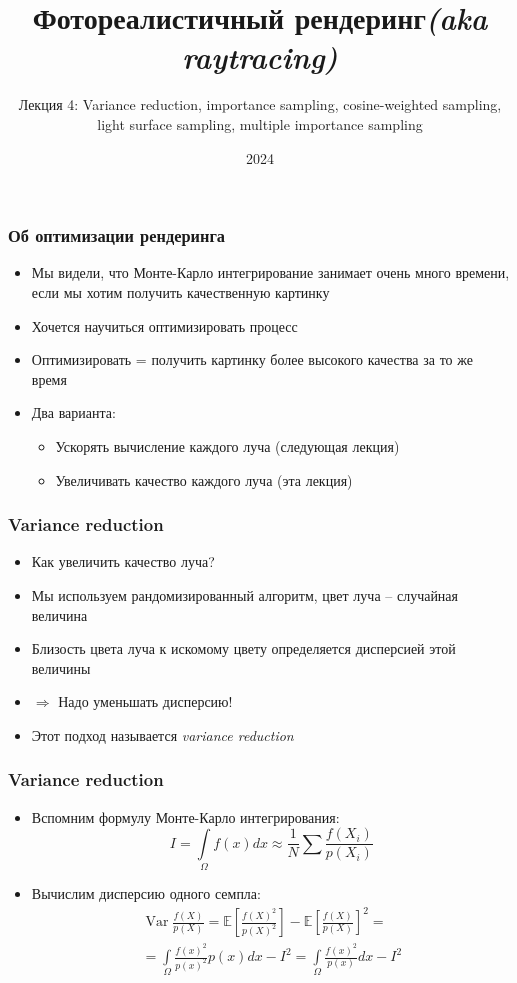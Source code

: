 \documentclass[handout,10pt]{beamer}
\title{Фотореалистичный рендеринг\quad\quad\quad\quad\quad\quad \textit{(aka raytracing)}}
\subtitle{Лекция 4: Variance reduction, importance sampling, cosine-weighted sampling, light surface sampling, multiple importance sampling}
\date{2024}
\begin{document}
\frame{\titlepage}

\begin{frame}
\frametitle{Об оптимизации рендеринга}
\begin{itemize}
\item Мы видели, что Монте-Карло интегрирование занимает очень много времени, если мы хотим получить качественную картинку
\pause
\item Хочется научиться оптимизировать процесс
\pause
\item Оптимизировать = получить картинку более высокого качества за то же время
\pause
\item Два варианта:
\pause
\begin{itemize}
\item Ускорять вычисление каждого луча (следующая лекция)
\pause
\item Увеличивать качество каждого луча (эта лекция)
\end{itemize}
\end{itemize}
\end{frame}

\begin{frame}
\frametitle{Variance reduction}
\begin{itemize}
\item Как увеличить качество луча?
\pause
\item Мы используем рандомизированный алгоритм, цвет луча -- случайная величина
\pause
\item Близость цвета луча к искомому цвету определяется дисперсией этой величины
\pause
\item \begin{math}\Longrightarrow\end{math} Надо уменьшать дисперсию!
\pause
\item Этот подход называется \textit{variance reduction}
\end{itemize}
\end{frame}

\begin{frame}
\frametitle{Variance reduction}
\begin{itemize}
\item Вспомним формулу Монте-Карло интегрирования:
\begin{equation*}
I = \int\limits_\Omega f(x)dx \approx \frac{1}{N} \sum \frac{f(X_i)}{p(X_i)}
\end{equation*}
\pause
\item Вычислим дисперсию одного семпла:
\begin{gather*}
\operatorname{Var}\frac{f(X)}{p(X)} = \mathbb{E}\left[\frac{f(X)^2}{p(X)^2}\right] - \mathbb{E}\left[\frac{f(X)}{p(X)}\right]^2 = \\
= \int\limits_\Omega \frac{f(x)^2}{p(x)^2}p(x)dx - I^2 = \int\limits_\Omega \frac{f(x)^2}{p(x)}dx - I^2
\end{gather*}
\end{itemize}
\end{frame}
\end{document}
